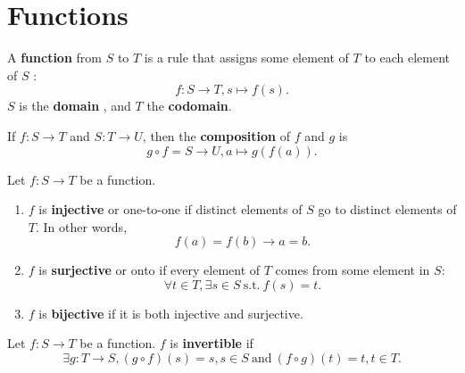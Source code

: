 \documentclass[math1530-lecture-notes.tex]{subfiles}
\begin{document}
\section{Functions}
\begin{definition}[Functions]{}
  A \textbf{function}  from $S$ to $T$ is a rule that assigns some element of $T$ to each element of
  $S$ : \[
    f: S \to T, s\mapsto f(s) 
  .\]
  $S$ is the \textbf{domain} , and $T$ the \textbf{codomain}.
\end{definition}

\begin{definition}{}
  If $f: S \to T$ and $S: T\to U$, then the \textbf{composition} of $f$ and $g$ is \[
    g \circ f = S \to  U, a\mapsto g(f(a))
  .\] 
\end{definition}

\begin{definition}[Bijectivity]{}
  Let $f:S\to T$ be a function.
  \begin{enumerate}
    \item $f$ is \textbf{injective} or one-to-one if distinct elements of $S$ go to distinct
      elements of $T$. In other words, \[
        f(a) = f(b) \to a=b
      .\] 
    \item $f$ is \textbf{surjective} or onto if every element of $T$ comes from some element in $S$:
      \[
        \forall t\in T, \exists s \in S ~\text{s.t.}~f(s) = t
      .\] 
    \item $f$ is \textbf{bijective}  if it is both injective and surjective.
  \end{enumerate}
\end{definition}

\begin{definition}[Invertibility]{}
  Let $f:S\to T$ be a function. $f$ is \textbf{invertible} if \[
    \exists g:T\to S, (g \circ f)(s) = s, s \in S ~\text{and}~ (f\circ g)(t) = t, t\in T
  .\] 
\end{definition}
\end{document}
